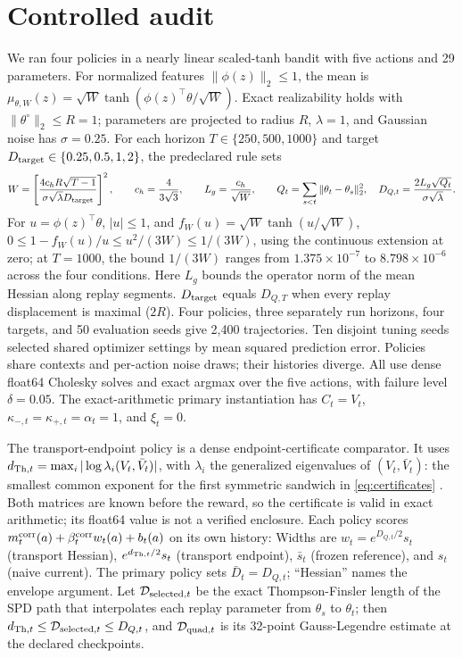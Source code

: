 \documentclass[10pt]{article}
\theoremstyle{definition}
\newcommand{\Vbar}{\bar V}
\newcommand{\Dbar}{\bar D}
\begin{document}
\section{Controlled audit}
We ran four policies in a nearly linear scaled-tanh bandit with five actions and 29 parameters. For normalized features $\|\phi(z)\|_2\le1$, the mean is $\mu_{\theta,W}(z)=\sqrt W\tanh(\phi(z)^\top\theta/\sqrt W)$. Exact realizability holds with $\|\theta^\circ\|_2\le R=1$; parameters are projected to radius $R$, $\lambda=1$, and Gaussian noise has $\sigma=0.25$. For each horizon $T\in\{250,500,1000\}$ and target $D_{\rm target}\in\{0.25,0.5,1,2\}$, the predeclared rule sets
\begin{equation}
W=\left[\frac{4c_hR\sqrt{T-1}}{\sigma\sqrt\lambda D_{\rm target}}\right]^2,
\qquad c_h=\frac4{3\sqrt3},\qquad L_g=\frac{c_h}{\sqrt W},\qquad
Q_t=\sum_{s<t}\|\theta_t-\theta_s\|_2^2,\quad D_{Q,t}=\frac{2L_g\sqrt{Q_t}}{\sigma\sqrt\lambda}.
\label{eq:experiment-scale}
\end{equation}
For $u=\phi(z)^\top\theta$, $|u|\le1$, and
$f_W(u)=\sqrt W\tanh(u/\sqrt W)$,
$0\le1-f_W(u)/u\le u^2/(3W)\le1/(3W)$, using the continuous extension
at zero; at $T=1000$, the bound $1/(3W)$ ranges from
$1.375\times10^{-7}$ to $8.798\times10^{-6}$ across the four conditions.
Here $L_g$ bounds the operator norm of the mean Hessian along replay segments. $D_{\rm target}$ equals $D_{Q,T}$ when every replay displacement is maximal ($2R$). Four policies, three separately run horizons, four targets, and 50 evaluation seeds give 2,400 trajectories. Ten disjoint tuning seeds selected shared optimizer settings by mean squared prediction error. Policies share contexts and per-action noise draws; their histories diverge. All use dense float64 Cholesky solves and exact argmax over the five actions, with failure level $\delta=0.05$. The exact-arithmetic primary instantiation has $C_t=V_t$, $\kappa_{-,t}=\kappa_{+,t}=\alpha_t=1$, and $\xi_t=0$.

The transport-endpoint policy is a dense endpoint-certificate comparator. It uses
$d_{{\rm Th},t}=\max_i|\log\lambda_i(V_t,\Vbar_t)|$, with
$\lambda_i$ the generalized eigenvalues of $(V_t,\Vbar_t)$:
the smallest common exponent for the first symmetric sandwich in
\eqref{eq:certificates} \cite{nussbaum1994finsler}.
Both matrices are known before the reward, so the certificate is valid
in exact arithmetic; its float64 value is not a verified enclosure.
Each policy scores
$m_t^{\rm corr}(a)+\beta_t^{\rm corr}w_t(a)+b_t(a)$ on its own history:
Widths are $w_t=e^{D_{Q,t}/2}s_t$ (transport Hessian),
$e^{d_{{\rm Th},t}/2}s_t$ (transport endpoint),
$\bar s_t$ (frozen reference), and $s_t$ (naive current).
The primary policy sets $\Dbar_t=D_{Q,t}$; ``Hessian'' names the
envelope argument. Let $\mathcal D_{{\rm selected},t}$ be the exact
Thompson-Finsler length of the SPD path that interpolates each replay
parameter from $\theta_s$ to $\theta_t$; then
$d_{{\rm Th},t}\le\mathcal D_{{\rm selected},t}\le D_{Q,t}$, and
$\mathcal D_{{\rm quad},t}$ is its 32-point Gauss-Legendre estimate
at the declared checkpoints.
\end{document}
